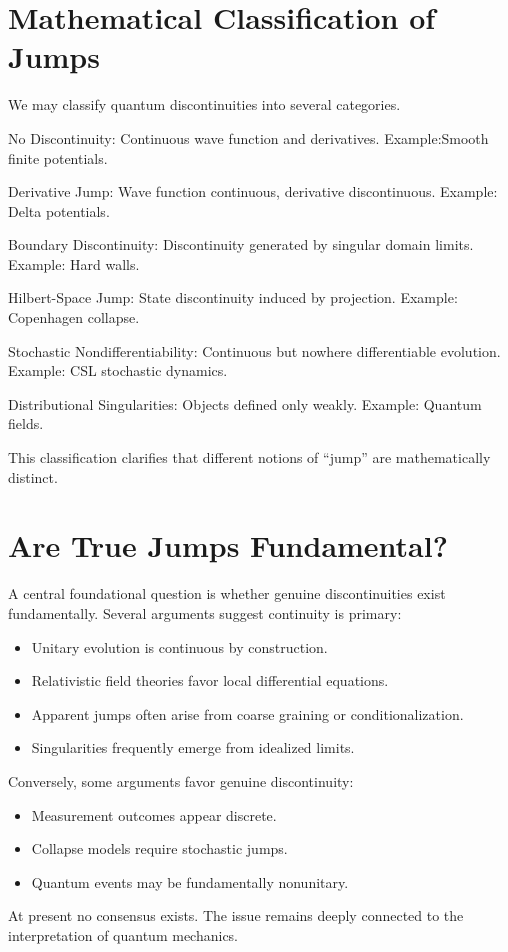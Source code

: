 \documentclass[11pt]{article}
\begin{document}
\section{ Mathematical Classification of Jumps}

We may classify quantum discontinuities into several categories.

No Discontinuity:
Continuous wave function and derivatives.
Example:Smooth finite potentials.

Derivative Jump:
Wave function continuous, derivative discontinuous.
Example: Delta potentials.

Boundary Discontinuity:
Discontinuity generated by singular domain limits.
Example: Hard walls.

Hilbert-Space Jump:
State discontinuity induced by projection.
Example: Copenhagen collapse.

Stochastic Nondifferentiability:
Continuous but nowhere differentiable evolution.
Example: CSL stochastic dynamics.

Distributional Singularities:
Objects defined only weakly.
Example: Quantum fields.

This classification clarifies that different notions of “jump” 
are mathematically distinct.

\section{ Are True Jumps Fundamental?}

A central foundational question is whether genuine 
discontinuities exist fundamentally.
Several arguments suggest continuity is primary:
\begin{itemize}
   \item Unitary evolution is continuous by construction.
   \item Relativistic field theories favor local differential equations.
   \item Apparent jumps often arise from coarse graining or conditionalization.
   \item Singularities frequently emerge from idealized limits.
\end{itemize}
Conversely, some arguments favor genuine discontinuity:
\begin{itemize}
   \item Measurement outcomes appear discrete.
   \item Collapse models require stochastic jumps.
   \item Quantum events may be fundamentally nonunitary.
\end{itemize}
At present no consensus exists.
The issue remains deeply connected to the interpretation of quantum mechanics.
\end{document}
